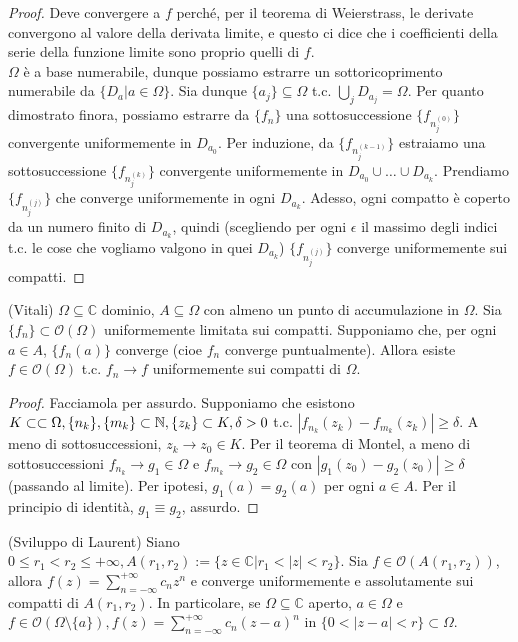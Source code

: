 \begin{proof}
  Deve convergere a $f$ perché, per il teorema di Weierstrass, le derivate convergono al valore della derivata limite, e questo ci dice che i coefficienti della serie della funzione limite sono proprio quelli di $f$. \\
  $\Omega$ è a base numerabile, dunque possiamo estrarre un sottoricoprimento numerabile da $\{D_a | a \in \Omega\}$. Sia dunque $\{a_j\} \subseteq \Omega$ t.c. $\displaystyle \bigcup_j D_{a_j}=\Omega$. Per quanto dimostrato finora, possiamo estrarre da $\{f_n\}$ una sottosuccessione $\{f_{n_j^{(0)}}\}$ convergente uniformemente in $D_{a_0}$.
  Per induzione, da $\{f_{n_j^{(k-1)}}\}$ estraiamo una sottosuccessione $\{f_{n_j^{(k)}}\}$ convergente uniformemente in $D_{a_0} \cup \dots \cup D_{a_k}$. Prendiamo $\{f_{n_j^{(j)}}\}$ che converge uniformemente in ogni $D_{a_k}$.
  Adesso, ogni compatto è coperto da un numero finito di $D_{a_k}$, quindi (scegliendo per ogni $\epsilon$ il massimo degli indici t.c. le cose che vogliamo valgono in quei $D_{a_k}$) $\{f_{n_j^{(j)}}\}$ converge uniformemente sui compatti.
\end{proof}

\begin{thm}
  (Vitali) $\Omega \subseteq \mathbb{C}$ dominio, $A \subseteq \Omega$ con almeno un punto di accumulazione in $\Omega$. Sia $\{f_n\} \subset \mathcal{O}(\Omega)$ uniformemente limitata sui compatti. Supponiamo che, per ogni $a \in A$, $\{f_n(a)\}$ converge (cioe $f_n$ converge puntualmente). Allora esiste $f \in \mathcal{O}(\Omega)$ t.c. $f_n \longrightarrow f$ uniformemente sui compatti di $\Omega$.
\end{thm}

\begin{proof}
  Facciamola per assurdo. Supponiamo che esistono $K \subset\subset \Omega, \\ \{n_k\}, \{m_k\} \subset \mathbb{N}, \{z_k\} \subset K, \delta>0$ t.c. $|f_{n_k}(z_k)-f_{m_k}(z_k)| \ge \delta$. A meno di sottosuccessioni, $z_k \longrightarrow z_0 \in K$.
  Per il teorema di Montel, a meno di sottosuccessioni $f_{n_k} \longrightarrow g_1 \in \Omega$ e $f_{m_k} \longrightarrow g_2 \in \Omega$ con $|g_1(z_0)-g_2(z_0)| \ge \delta$ (passando al limite). Per ipotesi,  $g_1(a)=g_2(a)$ per ogni $a \in A$. Per il principio di identità, $g_1 \equiv g_2$, assurdo.
\end{proof}

\begin{thm}
  (Sviluppo di Laurent) Siano $0 \le r_1 < r_2 \le +\infty, A(r_1, r_2):=\{z \in \mathbb{C} | r_1 < |z| < r_2 \}$. Sia $f \in \mathcal{O}(A(r_1, r_2))$, allora $\displaystyle f(z)=\sum_{n=-\infty}^{+\infty} c_nz^n$ e converge uniformemente e assolutamente sui compatti di $A(r_1, r_2)$.
  In particolare, se $\Omega \subseteq \mathbb{C}$ aperto, $a \in \Omega$ e $\displaystyle f \in \mathcal{O}(\Omega \setminus \{a\}), f(z)=\sum_{n=-\infty}^{+\infty} c_n(z-a)^n$ in $\{0<|z-a|<r\} \subset \Omega$.
\end{thm}

